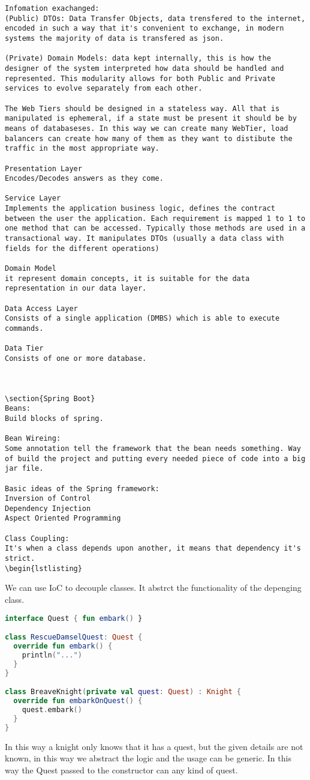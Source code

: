 \documentclass[12pt]{article}
\begin{document}
\begin{lstlisting}
Infomation exachanged:
(Public) DTOs: Data Transfer Objects, data trensfered to the internet, encoded in such a way that it's convenient to exchange, in modern systems the majority of data is transfered as json.

(Private) Domain Models: data kept internally, this is how the designer of the system interpreted how data should be handled and represented. This modularity allows for both Public and Private services to evolve separately from each other.

The Web Tiers should be designed in a stateless way. All that is manipulated is ephemeral, if a state must be present it should be by means of databaseses. In this way we can create many WebTier, load balancers can create how many of them as they want to distibute the traffic in the most appropriate way.

Presentation Layer
Encodes/Decodes answers as they come.

Service Layer
Implements the application business logic, defines the contract between the user the application. Each requirement is mapped 1 to 1 to one method that can be accessed. Typically those methods are used in a transactional way. It manipulates DTOs (usually a data class with fields for the different operations)

Domain Model
it represent domain concepts, it is suitable for the data representation in our data layer.

Data Access Layer 
Consists of a single application (DMBS) which is able to execute commands.

Data Tier
Consists of one or more database. 



\section{Spring Boot}
Beans:
Build blocks of spring.

Bean Wireing:
Some annotation tell the framework that the bean needs something. Way of build the project and putting every needed piece of code into a big jar file.

Basic ideas of the Spring framework:
Inversion of Control
Dependency Injection
Aspect Oriented Programming

Class Coupling:
It's when a class depends upon another, it means that dependency it's strict. 
\begin{lstlisting}
\end{lstlisting}
We can use IoC to decouple classes. It abstrct the functionality of the depenging class.
\begin{lstlisting}[language=kotlin]
interface Quest { fun embark() }

class RescueDamselQuest: Quest {
  override fun embark() {
    println("...")
  }
}

class BreaveKnight(private val quest: Quest) : Knight {
  override fun embarkOnQuest() {
    quest.embark()
  }
}
\end{lstlisting}
In this way a knight only knows that it has a quest, but the given details are not known, in this way we abstract the logic and the usage can be generic. In this way the Quest passed to the constructor can any kind of quest.
\end{document}
